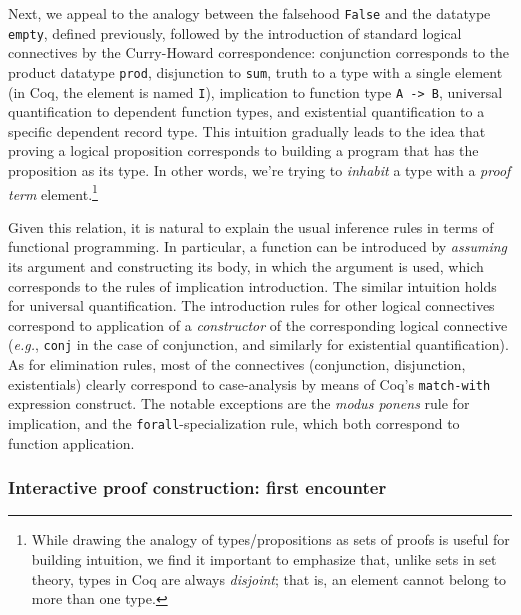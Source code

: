 \documentclass[blockstyle,preprint,nocopyrightspace]{sigplanconf}
\newcommand{\is}[1]{\textcolor{blue}{(Ilya: {#1})}}
\newcommand{\an}[1]{\textcolor{red}{(Aleks: {#1})}}
\newcommand{\code}[1]{\lstinline{#1}}
\newcommand{\eg}{\emph{e.g.}\xspace}
\begin{document}
Next, we appeal to the analogy between the falsehood \code{False} and
the datatype \code{empty}, defined previously, followed by the
introduction of standard logical connectives by the Curry-Howard
correspondence: conjunction corresponds to the product datatype
\code{prod}, disjunction to \code{sum}, truth to a type with a single
element (in Coq, the element is named \code{I}), implication to
function type \code{A -> B}, universal quantification to dependent
function types, and existential quantification to a specific dependent
record type. This intuition gradually leads to the idea that proving a
logical proposition corresponds to building a program that has the
proposition as its type. In other words, we're trying to
\emph{inhabit} a type with a \emph{proof term} element.\footnote{While
  drawing the analogy of types/propositions as sets of proofs is
  useful for building intuition, we find it important to emphasize
  that, unlike sets in set theory, types in Coq are always
  \emph{disjoint}; that is, an element cannot belong to more than one
  type.}

Given this relation, it is natural to explain the usual inference rules
in terms of functional programming.
%
In particular, a function can be introduced by \emph{assuming} its
argument and constructing its body, in which the argument is used,
which corresponds to the rules of implication introduction. The
similar intuition holds for universal quantification. The introduction
rules for other logical connectives correspond to application of a
\emph{constructor} of the corresponding logical connective (\eg,
\code{conj} in the case of conjunction, and similarly for existential
quantification). As for elimination rules, most of the connectives
(conjunction, disjunction, existentials) clearly correspond to
case-analysis by means of Coq's \code{match-with} expression
construct. 
%
%
 The notable exceptions are the \emph{modus ponens}
rule for implication, and the \code{forall}-specialization rule, which
both correspond to function application.

\subsubsection{Interactive proof construction: first encounter}
\label{sec:inter-proof-constr}
\end{document}

